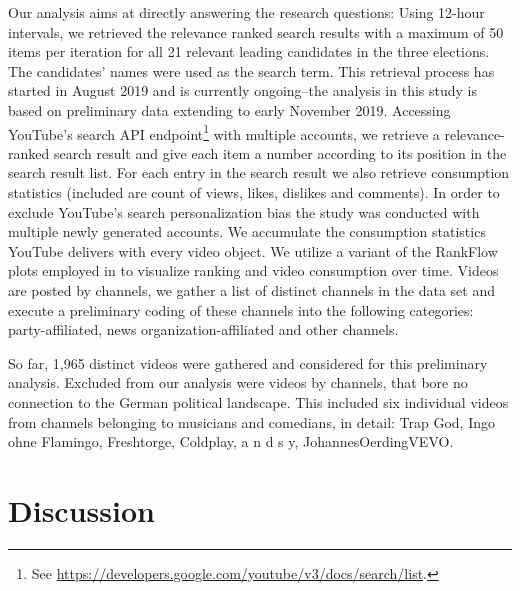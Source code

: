 \documentclass[sigchi, nonacm=true]{acmart}
\begin{document}
   Our analysis aims at directly answering the research questions: Using 12-hour intervals, we retrieved the relevance ranked search results with a maximum of 50 items per iteration for all 21 relevant leading candidates in the three elections. The candidates’ names were used as the search term. This retrieval process has started in August 2019 and is currently ongoing–the analysis in this study is based on preliminary data extending to early November 2019. Accessing YouTube's search API endpoint\footnote{See \url{https://developers.google.com/youtube/v3/docs/search/list}.} with multiple accounts, we retrieve a relevance-ranked search result and give each item a number according to its position in the search result list. For each entry in the search result we also retrieve consumption statistics (included are count of views, likes, dislikes and comments). In order to exclude YouTube's search personalization bias the study was conducted with multiple newly generated accounts.
  We accumulate the consumption statistics YouTube delivers with every video object. We utilize a variant of the RankFlow plots employed in \cite{rieder_ranking_2018} to visualize ranking and video consumption over time.
  Videos are posted by channels, we gather a list of distinct channels in the data set and execute a preliminary coding of these channels into the following categories: party-affiliated, news organization-affiliated and other channels.
  

  So far, 1,965 distinct videos were gathered and considered for this preliminary analysis. Excluded from our analysis were videos by channels, that bore no connection to the German political landscape. This included six individual videos from channels belonging to musicians and comedians, in detail: Trap God, Ingo ohne Flamingo, Freshtorge, Coldplay, a n d s y, JohannesOerdingVEVO.

\section{Discussion}
\end{document}
